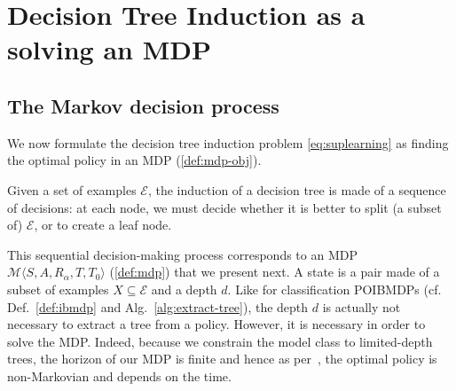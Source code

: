 \chapter{Decision Tree Induction as a solving an MDP}\label{sec:dt-mdp}

\section{The Markov decision process}\label{sec:the-mdp}
We now formulate the decision tree induction problem \ref{eq:suplearning} as finding the optimal policy in an MDP (\ref{def:mdp-obj}).

Given a set of examples $\mathcal{E}$, the induction of a decision tree is made of a sequence of decisions: at each node, we must decide whether it is better to split (a subset of) $\mathcal{E}$, or %
to create a leaf node.

This sequential decision-making process corresponds to an MDP $\mathcal{M} \langle S, A, R_{\alpha}, T, T_0 \rangle$ (\ref{def:mdp}) that we present next.
A state is a pair made of a subset of examples $X\subseteq\mathcal E$ and a depth $d$.
Like for classification POIBMDPs (cf. Def.~\ref{def:ibmdp} and Alg.~\ref{alg:extract-tree}), the depth $d$ is actually not necessary to extract a tree from a policy.
However, it is necessary in order to solve the MDP.
Indeed, because we constrain the model class to limited-depth trees, the horizon of our MDP is finite and hence as per~\cite{puterman}, the optimal policy is non-Markovian and depends on the time.

